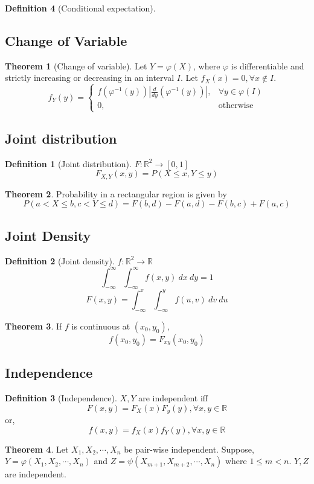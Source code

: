 \documentclass[10pt, a4paper]{extarticle}
\theoremstyle{definition}
\newtheorem{thm}{Theorem}
\newtheorem{defn}{Definition}
\begin{document}
\begin{defn}[Conditional expectation]
	\subsection{Change of Variable}
	\begin{thm}[Change of variable]
		Let $Y=\varphi(X)$, where $\varphi$ is differentiable and strictly increasing or decreasing in an interval $I$. Let $f_X(x)=0,\forall x\notin I$.
		\[f_Y(y)=
			\begin{cases}
				f\left(\varphi^{-1}(y)\right)\left|\frac{d}{dy}\left(\varphi^{-1}(y)\right)\right|,&\forall y\in\varphi(I)\\
				0,&\text{otherwise}
			\end{cases}
		\]
	\end{thm}

	\subsection{Joint distribution}
	\begin{defn}[Joint distribution]
		$F:\mathbb{R}^2\to[0,1]$
		\[F_{X,Y}(x,y)=P(X\leq x,Y\leq y)\]
	\end{defn}
	\begin{thm}
		Probability in a rectangular region is given by
		\[P(a<X\leq b,c<Y\leq d)=F(b,d)-F(a,d)-F(b,c)+F(a,c)\]
	\end{thm}

	\subsection{Joint Density}
	\begin{defn}[Joint density]
		$f:\mathbb{R}^2\to\mathbb{R}$
		\[\int_{-\infty}^\infty \int_{-\infty}^\infty f(x,y)\ dx\ dy=1\]
		\[F(x,y)=\int_{-\infty}^x \int_{-\infty}^y f(u,v)\ dv\ du\]
	\end{defn}

	\begin{thm}
		If $f$ is continuous at $(x_0,y_0)$,
		\[f(x_0,y_0)=F_{xy}(x_0,y_0)\]
	\end{thm}

	\subsection{Independence}
	\begin{defn}[Independence]
		$X,Y$ are independent iff
		\[F(x,y)=F_X(x)F_y(y),\forall x,y\in\mathbb{R}\]
		or,
		\[f(x,y)=f_X(x)f_Y(y),\forall x,y\in\mathbb{R}\]
	\end{defn}
	\begin{thm}
		Let $X_1,X_2,\cdots, X_n$ be pair-wise independent. Suppose, $Y=\varphi(X_1,X_2,\cdots,X_n)$ and $Z=\psi(X_{m+1},X_{m+2},\cdots,X_n)$ where $1\leq m<n$. $Y,Z$ are independent.
	\end{thm}


\end{defn}
\end{document}
